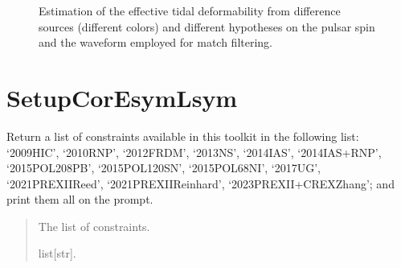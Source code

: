\documentclass[letterpaper,10pt,english]{sphinxmanual}
\begin{document}
\begin{figure}[htbp]
\centering
\capstart

\noindent{}
\caption{Estimation of the effective tidal deformability from difference sources (different colors) and different hypotheses on the pulsar spin and the waveform employed for match filtering.}\label{\detokenize{source/api/setup_astro_gw:id1}}\end{figure}

\sphinxstepscope


\section{SetupCorEsymLsym}
\label{\detokenize{source/api/setup_CorEsymLsym:setupcoresymlsym}}\label{\detokenize{source/api/setup_CorEsymLsym::doc}}\label{\detokenize{source/api/setup_CorEsymLsym:module-nucleardatapy.setup_CorEsymLsym}}

\begin{fulllineitems}
\label{\detokenize{source/api/setup_CorEsymLsym:nucleardatapy.setup_CorEsymLsym.CorEsymLsym_constraints}}
\pysigstartsignatures
\pysiglinewithargsret
{}
{}
{}
\pysigstopsignatures
\sphinxAtStartPar
Return a list of constraints available in this toolkit in the     following list: ‘2009\sphinxhyphen{}HIC’, ‘2010\sphinxhyphen{}RNP’, ‘2012\sphinxhyphen{}FRDM’, ‘2013\sphinxhyphen{}NS’,     ‘2014\sphinxhyphen{}IAS’, ‘2014\sphinxhyphen{}IAS+RNP’, ‘2015\sphinxhyphen{}POL\sphinxhyphen{}208PB’, ‘2015\sphinxhyphen{}POL\sphinxhyphen{}120SN’,     ‘2015\sphinxhyphen{}POL\sphinxhyphen{}68NI’, ‘2017\sphinxhyphen{}UG’, ‘2021\sphinxhyphen{}PREXII\sphinxhyphen{}Reed’,     ‘2021\sphinxhyphen{}PREXII\sphinxhyphen{}Reinhard’, ‘2023\sphinxhyphen{}PREXII+CREX\sphinxhyphen{}Zhang’; and     print them all on the prompt.
\begin{quote}\begin{description}
\sphinxAtStartPar
The list of constraints.

\sphinxAtStartPar
list{[}str{]}.

\end{description}\end{quote}

\end{fulllineitems}
\end{document}
